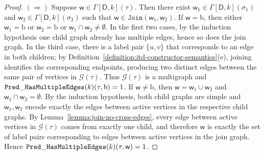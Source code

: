 \documentclass[11pt,a4paper]{article}
\newcommand{\truevalue}{1}
\newcommand{\treewidthvalue}{k}
\newcommand{\decompositiongraph}[1]{\mathcal{G}(#1)}
\newcommand{\jointype}{\mathtt{Join}}
\newcommand{\abstractdecomposition}{\tau}
\newcommand{\sigmaabstractdecomposition}{\sigma}
\newcommand{\vertexone}{u}
\newcommand{\vertextwo}{v}
\newcommand{\awitness}{\mathsf{w}}
\newcommand{\dpcore}{\mathsf{D}}
\newcommand{\dpNamePart}[1]{\mbox{\normalfont\ttfamily #1}}
\newcommand{\predicateHasMultiEdge}[1]{\dpNamePart{Pred}\_\allowbreak\dpNamePart{HasMultipleEdges}(#1)}
\newcommand{\dynamizationfunctionname}[1]{\Gamma[{#1}]}
\newcommand{\dynamizationfunction}[2]{\dynamizationfunctionname{#1,#2}}
\newcommand{\multiedgefound}{\mathrm{b}}
\begin{document}
{\begin{proof}
				$(\Rightarrow)$ Suppose \(\awitness\in \dynamizationfunction{\dpcore}{\treewidthvalue}(\abstractdecomposition)\). Then there exist \(\awitness_1\in \dynamizationfunction{\dpcore}{\treewidthvalue}(\sigmaabstractdecomposition_1)\) and \(\awitness_2\in \dynamizationfunction{\dpcore}{\treewidthvalue}(\sigmaabstractdecomposition_2)\) such that \(\awitness\in \jointype(\awitness_1,\awitness_2)\). If \(\awitness=\multiedgefound\), then either \(\awitness_1=\multiedgefound\) or \(\awitness_2=\multiedgefound\) or \(\awitness_1\cap \awitness_2\neq\emptyset\). In the first two cases, by the induction hypothesis one child graph already has multiple edges, hence so does the join graph. In the third case, there is a label pair \(\{\vertexone,\vertextwo\}\) that corresponds to an edge in both children; by Definition~\ref{definition:itd-constructor-semantics}(e), joining identifies the corresponding endpoints, producing two distinct edges between the same pair of vertices in \(\decompositiongraph{\abstractdecomposition}\). Thus \(\decompositiongraph{\abstractdecomposition}\) is a multigraph and \(\predicateHasMultiEdge{\treewidthvalue}(\abstractdecomposition,\multiedgefound)=\truevalue\). If \(\awitness\neq \multiedgefound\), then \(\awitness=\awitness_1\cup \awitness_2\) and \(\awitness_1\cap \awitness_2=\emptyset\). By the induction hypothesis, both child graphs are simple and \(\awitness_1,\awitness_2\) encode exactly the edges between active vertices in the respective child graphs. By Lemma~\ref{lemma:join-no-cross-edges}, every edge between active vertices in \(\decompositiongraph{\abstractdecomposition}\) comes from exactly one child, and therefore \(\awitness\) is exactly the set of label pairs corresponding to edges between active vertices in the join graph. Hence \(\predicateHasMultiEdge{\treewidthvalue}(\abstractdecomposition,\awitness)=\truevalue\).


\end{proof}}
\end{document}
